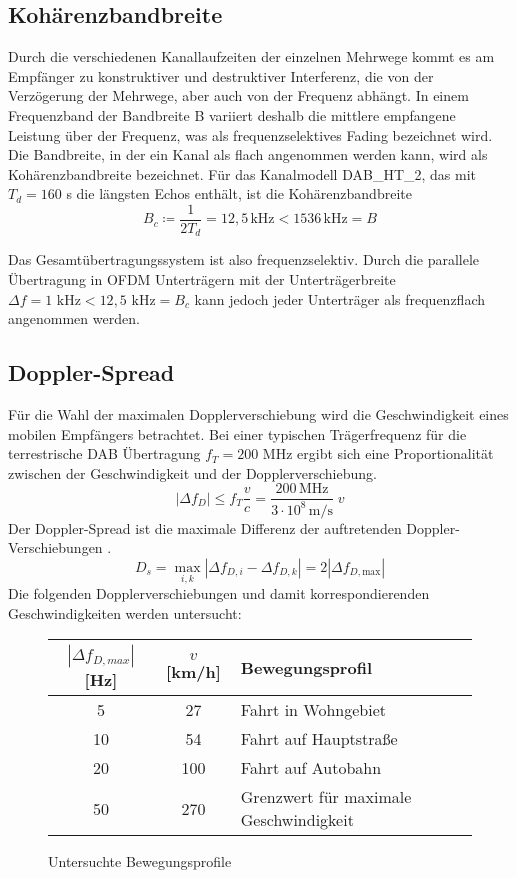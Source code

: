 \subsection{Kohärenzbandbreite}
Durch die verschiedenen Kanallaufzeiten der einzelnen Mehrwege kommt es am Empfänger zu konstruktiver und destruktiver Interferenz, die von der Verzögerung der Mehrwege, aber auch von der Frequenz abhängt. In einem Frequenzband der Bandbreite B variiert deshalb die mittlere empfangene Leistung über der Frequenz, was als frequenzselektives Fading bezeichnet wird. Die Bandbreite, in der ein Kanal als flach angenommen werden kann, wird als Kohärenzbandbreite bezeichnet. Für das Kanalmodell DAB\_HT\_2, das mit $T_d = 160$ \textmu s die längsten Echos enthält, ist die Kohärenzbandbreite
\begin{equation}
B_c \coloneqq \frac{1}{2 T_d} = 12,5\, \text{kHz} < 1536\, \text{kHz} = B
\end{equation}

Das Gesamtübertragungssystem ist also frequenzselektiv. Durch die parallele Übertragung in OFDM Unterträgern mit der Unterträgerbreite $\Delta f = 1 \text{ kHz} < 12,5 \text{ kHz} = B_c$ kann jedoch jeder Unterträger als frequenzflach angenommen werden.

\subsection{Doppler-Spread}
Für die Wahl der maximalen Dopplerverschiebung wird die Geschwindigkeit eines mobilen Empfängers betrachtet. Bei einer typischen Trägerfrequenz für die terrestrische DAB Übertragung $f_T=200$ MHz ergibt sich eine Proportionalität zwischen der Geschwindigkeit und der Dopplerverschiebung.
\begin{equation}
|\Delta f_{D}| \leq f_T \frac{v}{c} = \frac{200\, \text{MHz}}{3\cdot 10^8\, \text{m/s}}\; v
\end{equation}
Der Doppler-Spread ist die maximale Differenz der auftretenden Doppler-Verschiebungen \cite{proakis}.
\begin{equation}
D_s = \max_{i,k} |\Delta f_{D,i} - \Delta f_{D,k}| = 2 |\Delta f_{D,\text{max}}|
\end{equation}
Die folgenden Dopplerverschiebungen und damit korrespondierenden Geschwindigkeiten werden untersucht:

\begin{figure} [h]
\begin{center}
\begin{tabular}{c | c | l}
$|\Delta f_{D,max}|$ [Hz] & $v$ [km/h] & Bewegungsprofil \\
\hline
5 & 27 & Fahrt in Wohngebiet \\
10 & 54 & Fahrt auf Hauptstraße \\
20 & 100 & Fahrt auf Autobahn \\
50 & 270 & Grenzwert für maximale Geschwindigkeit
\end{tabular}
\caption{Untersuchte Bewegungsprofile}
\label{tab:doppler_werte}
\end{center}
\end{figure}


